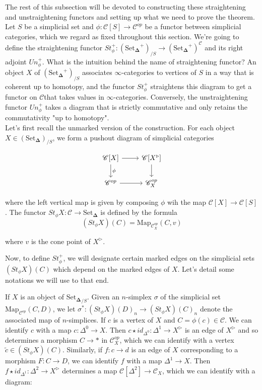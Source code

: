 \documentclass[12pt]{amsart}
\newcommand{\8}{\ensuremath{\infty}}
\newcommand{\C}{\ensuremath{\mathscr{C}}}
\newcommand{\SSet}{\ensuremath{\text{Set}_{\boldsymbol{\Delta}}}}
\newcommand{\Map}{\ensuremath{\text{Map}}}
\begin{document}
The rest of this subsection will be devoted to constructing these straightening and unstraightening functors and setting up what we need to prove the theorem.\\
Let $S$ be a simplicial set and $\phi:\mathscr{C}[S]\rightarrow \mathcal{C}^{op}$ be a functor between simplicial categories, which we regard as fixed throughout this section. We're going to define the straightening functor $St_\phi^+:(\SSet^+)_{/S}\rightarrow (\SSet^+)^\C$ and its right adjoint $Un_\phi^+$. What is the intuition behind the name of straightening functor? An object $X$ of $(\SSet^+)_{/S}$ associates \8-categories to vertices of $S$ in a way that is coherent up to homotopy, and the functor $St_\phi^+$ straightens this diagram to get a functor on \C that takes values in \8-categories. Conversely, the unstraightening functor $Un_\phi^+$ takes a diagram that is strictly commutative and only retains the commutativity "up to homotopy".\\
Let's first recall the unmarked version of the construction. For each object $X\in(\SSet)_{/S}$, we form a pushout diagram of simplicial categories

$$
  \begin{tikzcd}
    \mathscr{C}[X]\arrow[r] \arrow[d,"\phi"] &\mathscr{C}[X^\triangleright]\arrow[d]\\
    \C^{op} \arrow[r] &\C^{op}_X
  \end{tikzcd}
$$

where the left vertical map is given by composing $\phi$ wih the map $\mathscr{C}[X]\rightarrow \mathscr{C}[S]$. The functor $St_\phi X: \C\rightarrow \SSet$ is defined by the formula
$$
  (St_\phi X)(C) = \Map_{\C^{op}_X}(C,v)
$$

where $v$ is the cone point of $X^\triangleright$.

Now, to define $St_\phi^+$, we will designate certain marked edges on the simplicial sets $(St_\phi X)(C)$ which depend on the marked edges of $X$. Let's detail some notations we will use to that end.

If $X$ is an object of ${\SSet}_{/S}$. Given an $n$-simplex $\sigma$ of the simplicial set $\Map_{\C^{op}}(C,D)$, we let $\sigma^*:(St_\phi X)(D)_n \rightarrow (St_\phi X)(C)_n$ denote the associated map of $n$-simplices. If $c$ is a vertex of $X$ and $C = \phi(c)\in\C$. We can identify $c$ with a map $c:\Delta^0\rightarrow X$. Then $c\star id_{\Delta^0}:\Delta^1\rightarrow X^\triangleright$ is an edge of $X^\triangleright$ and so determines a morphism $C\rightarrow *$ in $\C^{op}_X$, which we can identify with a vertex $\tilde{c}\in(St_\phi X)(C)$. Similarly, if $f:c\rightarrow d$ is an edge of $X$ corresponding to a morphism $F:C\rightarrow D$, we can identify $f$ with a map $\Delta^1\rightarrow X$. Then $f\star id_{\Delta^1}:\Delta^2 \rightarrow X^\triangleright$ determines a map $\mathscr{C}[\Delta^2]\rightarrow \C_X$, which we can identify with a diagram:
\end{document}
